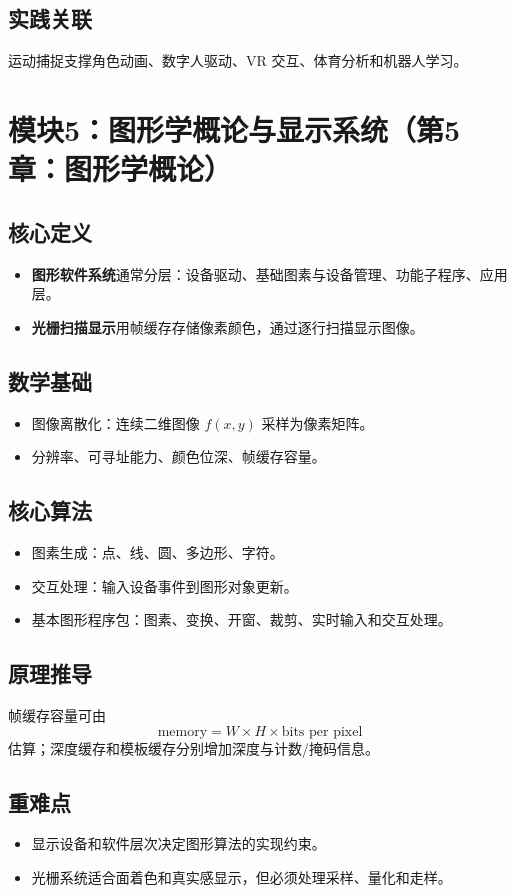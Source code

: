 \documentclass[UTF8,fontset=fandol,11pt]{ctexart}
\newcommand{\key}[1]{\textbf{#1}}
\begin{document}
\subsection{实践关联}
运动捕捉支撑角色动画、数字人驱动、VR 交互、体育分析和机器人学习。

\section{模块5：图形学概论与显示系统（第5章：图形学概论）}
\subsection{核心定义}
\begin{itemize}
  \item \key{图形软件系统}通常分层：设备驱动、基础图素与设备管理、功能子程序、应用层。
  \item \key{光栅扫描显示}用帧缓存存储像素颜色，通过逐行扫描显示图像。
\end{itemize}
\subsection{数学基础}
\begin{itemize}
  \item 图像离散化：连续二维图像 $f(x,y)$ 采样为像素矩阵。
  \item 分辨率、可寻址能力、颜色位深、帧缓存容量。
\end{itemize}
\subsection{核心算法}
\begin{itemize}
  \item 图素生成：点、线、圆、多边形、字符。
  \item 交互处理：输入设备事件到图形对象更新。
  \item 基本图形程序包：图素、变换、开窗、裁剪、实时输入和交互处理。
\end{itemize}
\subsection{原理推导}
帧缓存容量可由
\[
  \text{memory}=W\times H\times \text{bits per pixel}
\]
估算；深度缓存和模板缓存分别增加深度与计数/掩码信息。
\subsection{重难点}
\begin{itemize}
  \item 显示设备和软件层次决定图形算法的实现约束。
  \item 光栅系统适合面着色和真实感显示，但必须处理采样、量化和走样。
\end{itemize}
\end{document}
